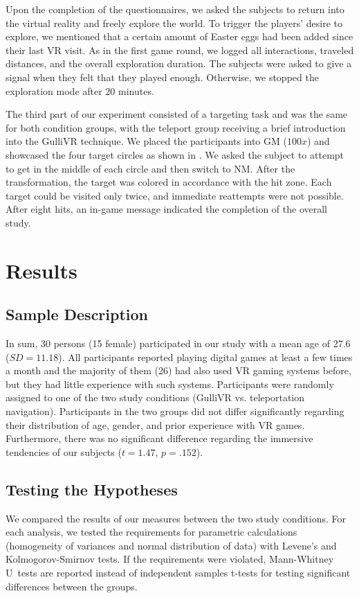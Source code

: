 \documentclass{sigchi}
\begin{document}
Upon the completion of the questionnaires, we asked the subjects to return into the virtual reality and freely explore the world. To trigger the players' desire to explore, we mentioned that a certain amount of Easter eggs had been added since their last VR visit. As in the first game round, we logged all interactions, traveled distances, and the overall exploration duration. The subjects were asked to give a signal when they felt that they played enough. Otherwise, we stopped the exploration mode after 20 minutes.

The third part of our experiment consisted of a targeting task and was the same for both condition groups, with the teleport group receiving a brief introduction into the GulliVR technique. We placed the participants into GM ($100x$) and showcased the four target circles as shown in . We asked the subject to attempt to get in the middle of each circle and then switch to NM. After the transformation, the target was colored in accordance with the hit zone. Each target could be visited only twice, and immediate reattempts were not possible. After eight hits, an in-game message indicated the completion of the overall study.




\section{Results}

\subsection{Sample Description}
In sum, 30 persons (15 female) participated in our study with a mean age of 27.6 ($SD=11.18$). All participants reported playing digital games at least a few times a month and the majority of them (26) had also used VR gaming systems before, but they had little experience with such systems. 
Participants were randomly assigned to one of the two study conditions (GulliVR vs. teleportation navigation). 
Participants in the two groups did not differ significantly regarding their distribution of age, gender, and prior experience with VR games. Furthermore, there was no significant difference regarding the immersive tendencies of our subjects ($t=1.47$, $p=.152$).

\subsection{Testing the Hypotheses} 
We compared the results of our measures between the two study conditions. For each analysis, we tested the requirements for parametric calculations (homogeneity of variances and normal distribution of data) with Levene's and Kolmogorov-Smirnov tests. If the requirements were violated, Mann-Whitney U~tests are reported instead of independent samples t-tests for testing significant differences between the groups. 
\end{document}
